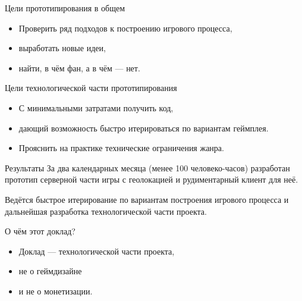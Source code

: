 \documentclass[aspectratio=169,handout,bigger]{beamer}
\begin{document}

\begin{frame}{Цели прототипирования в общем}
  \begin{itemize}
    \item Проверить ряд подходов к построению игрового процесса,
    \item выработать новые идеи,
    \item найти, в чём фан, а в чём --- нет.
  \end{itemize}
\end{frame}


\begin{frame}{Цели технологической части прототипирования}
  \begin{itemize}
    \item С минимальными затратами получить код,
    \item дающий возможность быстро итерироваться по вариантам геймплея.
    \item Прояснить на практике технические ограничения жанра.
  \end{itemize}
\end{frame}


\begin{frame}{Результаты}
  За два календарных месяца (менее 100 человеко-часов)
  разработан прототип серверной части игры с геолокацией
  и рудиментарный клиент для неё.
  \vspace*{1em}\par
  Ведётся быстрое итерирование по вариантам построения игрового процесса
  и дальнейшая разработка технологической части проекта.
\end{frame}


\begin{frame}{О чём этот доклад?}
  \begin{itemize}
    \item Доклад --- технологической части проекта,
    \item не о геймдизайне
    \item и не о монетизации.
  \end{itemize}
\end{frame}
\end{document}
